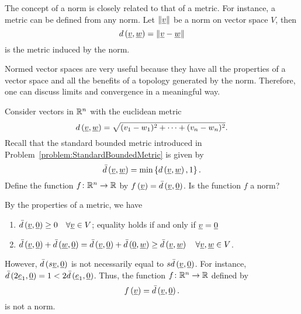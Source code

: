 The concept of a norm is closely related to that of a metric.
For instance, a metric can be defined from any norm.
Let $\left\| \underline{v} \right\|$ be a norm on vector space $V$, then
\begin{equation*}
d \left( \underline{v}, \underline{w} \right)
= \left\| \underline{v} - \underline{w} \right\|
\end{equation*}
is the metric induced by the norm.

Normed vector spaces are very useful because they have all the properties of a vector space and all the benefits of a topology generated by the norm.
Therefore, one can discuss limits and convergence in a meaningful way.

\begin{example}
Consider vectors in $\mathbb{R}^n$ with the euclidean metric
\begin{equation*}
d \left( \underline{v}, \underline{w} \right)
= \sqrt{ (v_1 - w_1)^2 + \cdots + (v_n - w_n)^2 }.
\end{equation*}
Recall that the standard bounded metric introduced in Problem~\ref{problem:StandardBoundedMetric} is given by
\begin{equation*}
\bar{d} \left( \underline{v}, \underline{w} \right)
= \min \left\{ d \left( \underline{v}, \underline{w} \right), 1 \right\}.
\end{equation*}
Define the function $f \colon \mathbb{R}^n \rightarrow \mathbb{R}$ by
$f \left( \underline{v} \right) = \bar{d} \left( \underline{v}, \underline{0} \right)$.
Is the function $f$ a norm?

By the properties of a metric, we have
\begin{enumerate}
\item $\bar{d} \left( \underline{v}, \underline{0} \right) \geq 0 \quad \forall \underline{v} \in V$; equality holds if and only if $\underline{v} = \underline{0}$
\item $\bar{d} \left( \underline{v}, \underline{0} \right) + \bar{d} \left( \underline{w}, \underline{0} \right) = \bar{d} \left( \underline{v}, \underline{0} \right) + \bar{d} \left( \underline{0}, \underline{w} \right) \geq \bar{d} \left( \underline{v}, \underline{w} \right) \quad \forall \underline{v}, \underline{w} \in V$.
\end{enumerate}
However, $\bar{d} \left( s \underline{v}, \underline{0} \right)$ is not necessarily equal to $s \bar{d} \left( \underline{v}, \underline{0} \right)$.
For instance,
$\bar{d} \left( 2 \underline{e}_1, \underline{0} \right) = 1 < 2 \bar{d} \left( \underline{e}_1, \underline{0} \right)$.
Thus, the function $f \colon \mathbb{R}^n \rightarrow \mathbb{R}$ defined by
\begin{equation*}
f \left( \underline{v} \right) = \bar{d} \left( \underline{v}, \underline{0} \right).
\end{equation*}
is not a norm.
\end{example}

